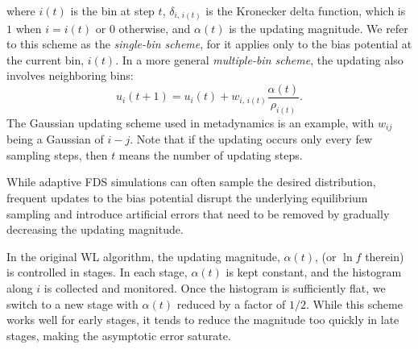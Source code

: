 \documentclass[reprint, superscriptaddress, floatfix]{revtex4-1}
\begin{document}
%
where $i(t)$ is the bin at step $t$,
$\delta_{i, \, i(t)}$ is the Kronecker delta function,
which is $1$ when $i = i(t)$ or $0$ otherwise,
and $\alpha(t)$ is the updating magnitude.
%
We refer to this scheme as the \emph{single-bin scheme},
for it applies only to the bias potential
at the current bin, $i(t)$.
%
In a more general \emph{multiple-bin scheme},
the updating also involves neighboring bins:
%
\begin{equation}
  u_i(t+1)
  =
  u_i(t)
  +
  w_{i, \, i(t)}
  \frac{ \alpha(t) }
       { \rho_{i(t)} }
  .
  \label{eq:mbin_update}
\end{equation}
%
The Gaussian updating scheme used in metadynamics
is an example, with $w_{ij}$ being a Gaussian of $i-j$.
%
Note that if the updating occurs
only every few sampling steps,
then $t$ means the number of updating steps.






While adaptive FDS simulations
can often sample the desired distribution,
frequent updates to the bias potential
disrupt the underlying equilibrium sampling
and introduce artificial errors that need to be
removed by gradually decreasing the updating magnitude\cite{
  belardinelli2007, *belardinelli2007jcp, *belardinelli2008, *belardinelli2016,
  zhou2005, morozov2007, zhou2008,
  laio2005, bussi2006, poulain2006, liang2007,
  crespo2010, *atchade2011, *fort2015}.
%





In the original WL algorithm\cite{
wang2001, wang2001pre},
the updating magnitude, $\alpha(t)$,
(or $\ln f$ therein)
is controlled in stages.
%
In each stage, $\alpha(t)$
is kept constant,
and the histogram along $i$
is collected and monitored.
%
Once the histogram is sufficiently flat,
we switch to a new stage
with $\alpha(t)$ reduced by a factor of $1/2$\cite{
wang2001, wang2001pre}.
%
While this scheme works well for early stages,
it tends to reduce the magnitude
too quickly in late stages, making the asymptotic error
saturate\cite{
belardinelli2007, *belardinelli2007jcp, *belardinelli2008, *belardinelli2016}.
\end{document}
